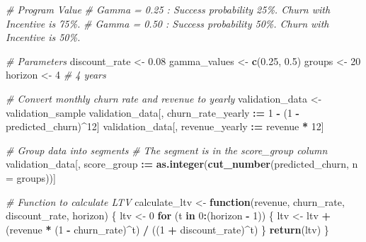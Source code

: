 \documentclass[
]{article}
\newenvironment{Shaded}{\begin{snugshade}}{\end{snugshade}}
\newcommand{\AttributeTok}[1]{\textcolor[rgb]{0.13,0.29,0.53}{#1}}
\newcommand{\CommentTok}[1]{\textcolor[rgb]{0.56,0.35,0.01}{\textit{#1}}}
\newcommand{\ControlFlowTok}[1]{\textcolor[rgb]{0.13,0.29,0.53}{\textbf{#1}}}
\newcommand{\DecValTok}[1]{\textcolor[rgb]{0.00,0.00,0.81}{#1}}
\newcommand{\FloatTok}[1]{\textcolor[rgb]{0.00,0.00,0.81}{#1}}
\newcommand{\FunctionTok}[1]{\textcolor[rgb]{0.13,0.29,0.53}{\textbf{#1}}}
\newcommand{\NormalTok}[1]{#1}
\newcommand{\OtherTok}[1]{\textcolor[rgb]{0.56,0.35,0.01}{#1}}
\newcommand{\SpecialCharTok}[1]{\textcolor[rgb]{0.81,0.36,0.00}{\textbf{#1}}}
\begin{document}
\begin{Shaded}
\begin{Highlighting}[]
\CommentTok{\# Program Value }
\CommentTok{\# Gamma = 0.25 : Success probability 25\%. Churn with Incentive is 75\%.}
\CommentTok{\# Gamma = 0.50 : Success probability 50\%. Churn with Incentive is 50\%.}

\CommentTok{\# Parameters}
\NormalTok{discount\_rate }\OtherTok{\textless{}{-}} \FloatTok{0.08}
\NormalTok{gamma\_values }\OtherTok{\textless{}{-}} \FunctionTok{c}\NormalTok{(}\FloatTok{0.25}\NormalTok{, }\FloatTok{0.5}\NormalTok{)}
\NormalTok{groups }\OtherTok{\textless{}{-}} \DecValTok{20}
\NormalTok{horizon }\OtherTok{\textless{}{-}} \DecValTok{4}  \CommentTok{\# 4 years}

\CommentTok{\# Convert monthly churn rate and revenue to yearly}
\NormalTok{validation\_data }\OtherTok{\textless{}{-}}\NormalTok{ validation\_sample }
\NormalTok{validation\_data[, churn\_rate\_yearly }\SpecialCharTok{:=} \DecValTok{1} \SpecialCharTok{{-}}\NormalTok{ (}\DecValTok{1} \SpecialCharTok{{-}}\NormalTok{ predicted\_churn)}\SpecialCharTok{\^{}}\DecValTok{12}\NormalTok{]}
\NormalTok{validation\_data[, revenue\_yearly }\SpecialCharTok{:=}\NormalTok{ revenue }\SpecialCharTok{*} \DecValTok{12}\NormalTok{]}

\CommentTok{\# Group data into segments }
\CommentTok{\# The segment is in the score\_group column}
\NormalTok{validation\_data[, score\_group }\SpecialCharTok{:=} \FunctionTok{as.integer}\NormalTok{(}\FunctionTok{cut\_number}\NormalTok{(predicted\_churn, }\AttributeTok{n =}\NormalTok{ groups))]}

\CommentTok{\# Function to calculate LTV}
\NormalTok{calculate\_ltv }\OtherTok{\textless{}{-}} \ControlFlowTok{function}\NormalTok{(revenue, churn\_rate, discount\_rate, horizon) \{}
\NormalTok{  ltv }\OtherTok{\textless{}{-}} \DecValTok{0}
  \ControlFlowTok{for}\NormalTok{ (t }\ControlFlowTok{in} \DecValTok{0}\SpecialCharTok{:}\NormalTok{(horizon }\SpecialCharTok{{-}} \DecValTok{1}\NormalTok{)) \{}
\NormalTok{    ltv }\OtherTok{\textless{}{-}}\NormalTok{ ltv }\SpecialCharTok{+}\NormalTok{ (revenue }\SpecialCharTok{*}\NormalTok{ (}\DecValTok{1} \SpecialCharTok{{-}}\NormalTok{ churn\_rate)}\SpecialCharTok{\^{}}\NormalTok{t) }\SpecialCharTok{/}\NormalTok{ ((}\DecValTok{1} \SpecialCharTok{+}\NormalTok{ discount\_rate)}\SpecialCharTok{\^{}}\NormalTok{t)}
\NormalTok{  \}}
  \FunctionTok{return}\NormalTok{(ltv)}
\NormalTok{\}}
\end{Highlighting}
\end{Shaded}
\end{document}

